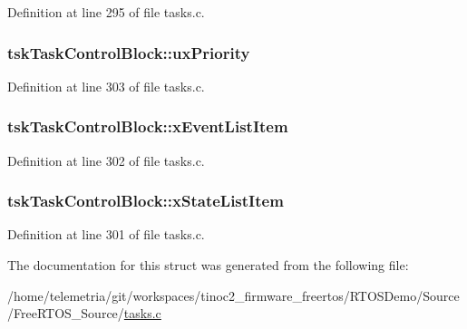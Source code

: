 Definition at line 295 of file tasks.\+c.

\subsubsection[{\texorpdfstring{ux\+Priority}{uxPriority}}]{ tsk\+Task\+Control\+Block\+::ux\+Priority}\hypertarget{structtsk_task_control_block_a79187811e3d2a15595942e3b44237d85}{}\label{structtsk_task_control_block_a79187811e3d2a15595942e3b44237d85}


Definition at line 303 of file tasks.\+c.

\subsubsection[{\texorpdfstring{x\+Event\+List\+Item}{xEventListItem}}]{ tsk\+Task\+Control\+Block\+::x\+Event\+List\+Item}\hypertarget{structtsk_task_control_block_a1a1612b6081a13683808284d93a9b28f}{}\label{structtsk_task_control_block_a1a1612b6081a13683808284d93a9b28f}


Definition at line 302 of file tasks.\+c.

\subsubsection[{\texorpdfstring{x\+State\+List\+Item}{xStateListItem}}]{ tsk\+Task\+Control\+Block\+::x\+State\+List\+Item}\hypertarget{structtsk_task_control_block_a16e0d20425d53ac78537e1fdb8834cf6}{}\label{structtsk_task_control_block_a16e0d20425d53ac78537e1fdb8834cf6}


Definition at line 301 of file tasks.\+c.



The documentation for this struct was generated from the following file\+:\begin{DoxyCompactItemize}
\item 
/home/telemetria/git/workspaces/tinoc2\+\_\+firmware\+\_\+freertos/\+R\+T\+O\+S\+Demo/\+Source/\+Free\+R\+T\+O\+S\+\_\+\+Source/\hyperlink{tasks_8c}{tasks.\+c}\end{DoxyCompactItemize}
